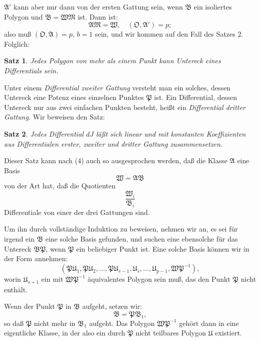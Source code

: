 \documentclass[12pt,a4paper]{article}
\newtheorem*{satz}{Satz}
\begin{document}
$\mathfrak{A}'$ kann aber nur dann von der ersten Gattung sein, wenn $\mathfrak{B}$ ein isoliertes Polygon und $\mathfrak{B} = \mathfrak{W}\mathfrak{M}$ ist. Dann ist:
\[
\mathfrak{A}\mathfrak{M} = \mathfrak{W}, \quad (\mathfrak{O}, \mathfrak{A}') = p;
\]
also muß $(\mathfrak{O}, \mathfrak{A}) = p$, $b = 1$ sein, und wir kommen auf den Fall des Satzes 2. Folglich:

\begin{satz}
Jedes Polygon von mehr als einem Punkt kann Untereck eines Differentials sein.
\end{satz}

Unter einem \emph{Differential zweiter Gattung} versteht man ein solches, dessen Untereck eine Potenz eines einzelnen Punktes $\mathfrak{P}$ ist. Ein Differential, dessen Untereck nur aus zwei einfachen Punkten besteht, heißt ein \emph{Differential dritter Gattung}. Wir beweisen den Satz:

\begin{satz}
Jedes Differential $dJ$ läßt sich linear und mit konstanten Koeffizienten aus Differentialen erster, zweiter und dritter Gattung zusammensetzen.
\end{satz}

Dieser Satz kann nach (4) auch so ausgesprochen werden, daß die Klasse $\mathfrak{A}$ eine Basis
\begin{equation}\label{eq:200-6}
\mathfrak{W} = \mathfrak{A}\mathfrak{B}
\end{equation}
von der Art hat, daß die Quotienten
\begin{equation}\label{eq:200-7}
\frac{\mathfrak{W}_i}{\mathfrak{B}_i}
\end{equation}
Differentiale von einer der drei Gattungen sind.

Um ihn durch vollständige Induktion zu beweisen, nehmen wir an, es sei für irgend ein $\mathfrak{B}$ eine solche Basis gefunden, und suchen eine ebensolche für das Untereck $\mathfrak{B}\mathfrak{P}$, wenn $\mathfrak{P}$ ein beliebiger Punkt ist. Eine solche Basis können wir in der Form annehmen:
\begin{equation}\label{eq:200-8}
(\mathfrak{P}\mathfrak{U}_1, \mathfrak{P}\mathfrak{U}_2, \ldots, \mathfrak{P}\mathfrak{U}_{s-1}, \mathfrak{U}_s, \ldots, \mathfrak{U}_{p-1}, \mathfrak{W}\mathfrak{P}^{-1}),
\end{equation}
worin $\mathfrak{U}_{s+1}$ ein mit $\mathfrak{W}\mathfrak{P}^{-1}$ äquivalentes Polygon sein muß, das den Punkt $\mathfrak{P}$ nicht enthält.

Wenn der Punkt $\mathfrak{P}$ in $\mathfrak{B}$ aufgeht, setzen wir:
\[
\mathfrak{B} = \mathfrak{P}\mathfrak{B}_1,
\]
so daß $\mathfrak{P}$ nicht mehr in $\mathfrak{B}_1$ aufgeht. Das Polygon $\mathfrak{W}\mathfrak{P}^{-1}$ gehört dann in eine eigentliche Klasse, in der also ein durch $\mathfrak{P}$ nicht teilbares Polygon $\mathfrak{U}$ existiert.
\end{document}
